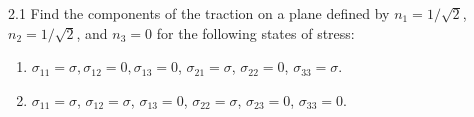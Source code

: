
\begin{problem}{2.1}
  Find the components of the traction on a plane defined by $n_1 = 1 / \sqrt{2}$, $n_2 = 1 / \sqrt{2}$, and $n_3 = 0$ for the following states of stress:
  \begin{enumerate}[label=(\alph*)]
    \item $\sigma_{11} = \sigma, \sigma_{12} = 0, \sigma_{13} = 0$, $\sigma_{21} = \sigma$, $\sigma_{22} = 0$, $\sigma_{33} = \sigma$.
    \item $\sigma_{11} = \sigma$, $\sigma_{12} = \sigma$, $\sigma_{13} = 0$, $\sigma_{22} = \sigma$, $\sigma_{23} = 0$, $\sigma_{33} = 0$.
  \end{enumerate}
\end{problem}

